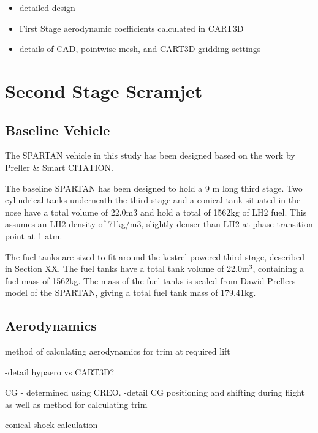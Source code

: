 \begin{itemize}
	\item detailed design
	\item First Stage aerodynamic coefficients calculated in CART3D
	\item details of CAD, pointwise mesh, and CART3D gridding settings
\end{itemize}
	
	
	\section{Second Stage Scramjet}
		\subsection{Baseline Vehicle}
		The SPARTAN vehicle in this study has been designed based on the work by Preller \& Smart CITATION. 
		
		The baseline SPARTAN has been designed to hold a 9 m long third stage.  Two cylindrical tanks underneath the third stage and a conical tank situated in the nose have a total volume of 22.0m3 and hold a total of 1562kg of LH2 fuel. This assumes an LH2 density of 71kg/m3, slightly denser than LH2 at phase transition point at 1 atm.
		
		
		
		The fuel tanks are sized to fit around the kestrel-powered third stage, described in Section XX. 
The fuel tanks have a total tank volume of 22.0m$^3$, containing a fuel mass of 1562kg.
The mass of the fuel tanks is scaled from Dawid Prellers model of the SPARTAN, giving a total fuel tank mass of 179.41kg.
		
		

		
		
		\subsection{Aerodynamics}
		method of calculating aerodynamics for trim at required lift
		
		-detail hypaero vs CART3D? 
		
				CG - determined using CREO.
		-detail  CG positioning and shifting during flight as well as method for calculating trim
		
		conical shock calculation
		
